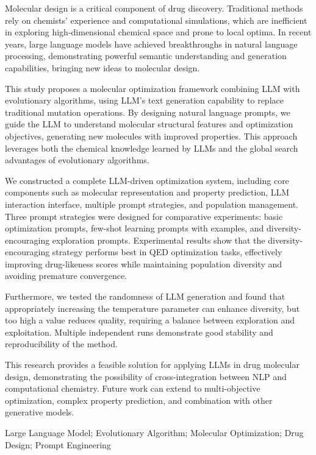 \begin{abstractENG}
Molecular design is a critical component of drug discovery. Traditional methods rely on chemists' experience and computational simulations, which are inefficient in exploring high-dimensional chemical space and prone to local optima. In recent years, large language models have achieved breakthroughs in natural language processing, demonstrating powerful semantic understanding and generation capabilities, bringing new ideas to molecular design.

This study proposes a molecular optimization framework combining LLM with evolutionary algorithms, using LLM's text generation capability to replace traditional mutation operations. By designing natural language prompts, we guide the LLM to understand molecular structural features and optimization objectives, generating new molecules with improved properties. This approach leverages both the chemical knowledge learned by LLMs and the global search advantages of evolutionary algorithms.

We constructed a complete LLM-driven optimization system, including core components such as molecular representation and property prediction, LLM interaction interface, multiple prompt strategies, and population management. Three prompt strategies were designed for comparative experiments: basic optimization prompts, few-shot learning prompts with examples, and diversity-encouraging exploration prompts. Experimental results show that the diversity-encouraging strategy performs best in QED optimization tasks, effectively improving drug-likeness scores while maintaining population diversity and avoiding premature convergence.

Furthermore, we tested the randomness of LLM generation and found that appropriately increasing the temperature parameter can enhance diversity, but too high a value reduces quality, requiring a balance between exploration and exploitation. Multiple independent runs demonstrate good stability and reproducibility of the method.

This research provides a feasible solution for applying LLMs in drug molecular design, demonstrating the possibility of cross-integration between NLP and computational chemistry. Future work can extend to multi-objective optimization, complex property prediction, and combination with other generative models.

\keywordsENG Large Language Model; Evolutionary Algorithm; Molecular Optimization; Drug Design; Prompt Engineering
\end{abstractENG}
